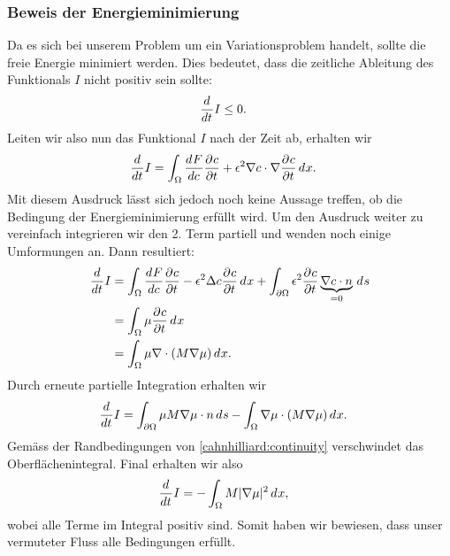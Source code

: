\subsubsection{Beweis der Energieminimierung}
Da es sich bei unserem Problem um ein Variationsproblem handelt,
sollte die freie Energie minimiert werden.
Dies bedeutet, dass die zeitliche Ableitung des Funktionals  $I$
nicht positiv sein sollte:
\begin{align*}
\frac{d^{}{}}{d{t^{}}} I
&\leq
0
.
\end{align*}
Leiten wir also nun das Funktional $I$ nach der Zeit ab,
erhalten wir
\begin{align*}
\frac{d^{}{}}{d{t^{}}} I
&=
\int_\Omega \frac{d^{}{F}}{d{c^{}}} \frac{\partial^{} c}{\partial t^{}}
+ \epsilon^2 \nabla c \cdot \nabla \frac{\partial^{} c}{\partial t^{}} \,d^{}{x}
.
\end{align*}
Mit diesem Ausdruck lässt sich jedoch noch keine Aussage treffen,
ob die Bedingung der Energieminimierung erfüllt wird.
Um den Ausdruck weiter zu vereinfach integrieren wir den 2. Term partiell
und wenden noch einige Umformungen an.
Dann resultiert:
\begin{align*}
\frac{d^{}{}}{d{t^{}}} I
&=
\int_\Omega \frac{d^{}{F}}{d{c^{}}} \frac{\partial^{} c}{\partial t^{}} - \epsilon^2 \Delta c \frac{\partial^{} c}{\partial t^{}} \,d^{}{x}
+ \int_{\partial\Omega} \epsilon^2 \frac{\partial^{} c}{\partial t^{}} \underbrace{\nabla c\cdot n}_{=0} \,d^{}{s}
\\
&=
\int_\Omega \mu \frac{\partial^{} c}{\partial t^{}} \,d^{}{x}
\\
&=
\int_\Omega \mu \nabla \cdot (M \nabla \mu) \,d^{}{x}
.
\end{align*}
Durch erneute partielle Integration erhalten wir
\begin{align*}
\frac{d^{}{}}{d{t^{}}} I
&=
\int_{\partial\Omega} \mu M \nabla \mu \cdot n \,d^{}{s} - \int_\Omega \nabla \mu \cdot (M \nabla \mu) \,d^{}{x}
.
\end{align*}
Gemäss der Randbedingungen von \eqref{cahnhilliard:continuity}
verschwindet das Oberflächenintegral.
Final erhalten wir also
\begin{align*}
\frac{d^{}{}}{d{t^{}}} I
&=
-\int_\Omega M |\nabla \mu|^2 \,d^{}{x}
,
\end{align*}
wobei alle Terme im Integral positiv sind.
Somit haben wir bewiesen,
dass unser vermuteter Fluss alle Bedingungen erfüllt.

